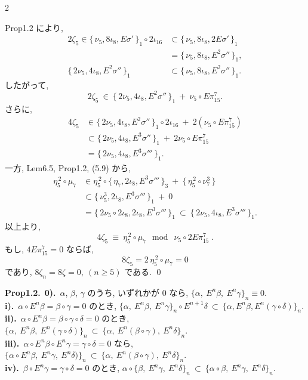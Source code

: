 \documentclass[10pt, leqno]{ltjsarticle}
\newcommand{\Ex}{E}        %
\newcommand{\todai}[2][]{\{\,#2\,\}_{#1}}      %
\newcommand{\gen}[1]{\{\,#1\,\}}       %
\numberwithin{equation}{section}
\theoremstyle{plain}
\theoremstyle{definition}
\theoremstyle{remark}
\begin{document}
\begin{paracol}{2}

\noindent
Prop1.2 により, 
\[
\begin{align*}
2\zeta_{5}\in\todai[1]{\nu_{5},8\iota_{8},E\sigma'}\circ 2\iota_{16}
& \subset \todai[1]{\nu_{5},8\iota_{8},2E\sigma'}\\
& = \todai[1]{\nu_{5},8\iota_{8},E^{2}\sigma''}, \\
\todai[1]{2\nu_{5},4\iota_{8},E^{2}\sigma''}
& \subset \todai[1]{\nu_{5},8\iota_{8},E^{2}\sigma''}.
\end{align*}
\]
したがって,
\[
2\zeta_{5}\ \in\ \todai[1]{2\nu_{5},4\iota_{8},E^{2}\sigma''}
\ +\ \nu_{5}\circ E\pi^{7}_{15} .
\]
さらに,
\[
\begin{align*}
4\zeta_{5}& \in \todai[1]{2\nu_{5},4\iota_{8},E^{2}\sigma''}\circ 2\iota_{16}
\ +\ 2(\nu_{5}\circ E\pi^{7}_{15}) \\
& \subset \todai[1]{2\nu_{5},4\iota_{8},E^{3}\sigma''}
\ +\ 2\nu_{5}\circ E\pi^{7}_{15} \\
& = \todai[1]{2\nu_5, 4\iota_8, E^3\sigma'''} .
\end{align*}
\]
一方, Lem6.5, Prop1.2, (5.9) から,
\[
\begin{align*}
\eta_{5}^{\,2}\circ\mu_{7}
& \in \eta_{5}^{\,2}\circ \todai[3]{\eta_{7},2\iota_{8},E^{3}\sigma'''}
\ +\ \gen{\eta_{5}^{\,2}\circ \nu_{7}^{3}} \\
& \subset \todai[1]{\nu_{5}^{3},2\iota_{8},E^{3}\sigma'''}\ +\ 0\\
& = \todai[1]{2\nu_{5}\circ2\iota_8,2\iota_{8},E^{3}\sigma'''}
\ \subset\ \todai[1]{2\nu_5, 4\iota_8, E^3\sigma'''} .
\end{align*}
\]
以上より,
\[
4\zeta_{5}\ \equiv\ \eta_{5}^{\,2}\circ \mu_{7}
\mod{\ \nu_{5}\circ 2E\pi^{7}_{15}\ } .
\]
もし, \(4E\pi^{7}_{15}=0\) ならば, 
\[
8\zeta_{5}=2\,\eta_{5}^{\,2}\circ \mu_{7}=0
\]
であり, \(8\zeta_{n}=8\zeta=0, \ (n\ge5)\) である. 
\qed

\switchcolumn

\noindent
\textbf{Prop1.2.}\
\textbf{0).}\ $\alpha$, $\beta$, $\gamma$ のうち, いずれかが $0$ なら,
\(
\{\alpha,\ \Ex^n\beta,\ \Ex^n\gamma\}_n\equiv0.
\)\\
\textbf{i).}\ $\alpha\circ \Ex^n\beta=\beta\circ\gamma=0$ のとき,
\(
\{\alpha,\ \Ex^n\beta,\ \Ex^n\gamma\}_n\circ\Ex^{n+1}\delta\ \subset\ \{\alpha,\Ex^n \beta, \Ex^n(\gamma\circ\delta)\}_n.
\)\\
\textbf{ii).}\ $\alpha\circ \Ex^n\beta=\beta\circ\gamma\circ\delta=0$ のとき,
\(
\{\alpha,\ \Ex^n\beta,\ \Ex^n(\gamma\circ\delta)\}_n\ \subset\ \{\alpha,\ \Ex^n(\beta\circ\gamma),\ \Ex^n\delta\}_n .
\)\\
\textbf{iii).}\ $\alpha\circ\Ex^n\beta\circ\Ex^n\gamma=\gamma\circ\delta=0$ なら,
\(
\{\alpha\circ\Ex^n\beta,\ \Ex^n\gamma,\ \Ex^n\delta)\}_n\ \subset\ \{\alpha,\ \Ex^n(\beta\circ\gamma),\ \Ex^n\delta\}_n .
\)\\
\textbf{iv).}\ $\beta\circ\Ex^n\gamma=\gamma\circ\delta=0$ のとき,
\(
\alpha\circ\{\beta,\ \Ex^n\gamma,\ \Ex^n\delta\}_n\ \subset\ \{\alpha\circ\beta,\ \Ex^n\gamma,\ \Ex^n\delta\}_n .
\)


\end{paracol}
\end{document}

